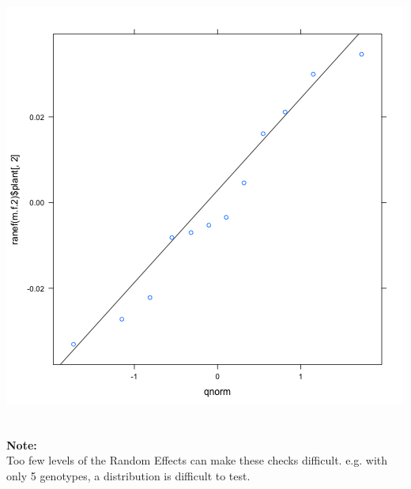 \documentclass{beamer}
\begin{document}
\begin{frame}[fragile]
\begin{columns}
\begin{column}{0.55\textwidth}
            \includegraphics[width=\textwidth]{lectures/day_7_diagnostics_of_mems/figures/unnamed-chunk-19-1.png}
        \end{column}
    \end{columns}
\end{frame}


\begin{frame}[fragile]
    \frametitle{}
    \large\textbf{Note:}\\
    Too few levels of the Random Effects can make these checks difficult.
    \color{violet} e.g. with only 5 genotypes, a distribution is difficult to test.
\end{frame}
\end{document}
